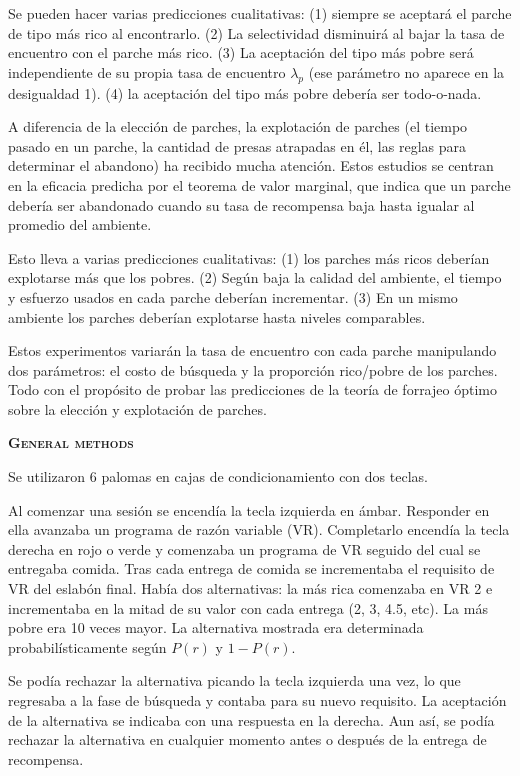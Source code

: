 \documentclass[a4paper,12pt]{article}
\begin{document}
Se pueden hacer varias predicciones cualitativas: (1) siempre se aceptará el parche de tipo más rico al encontrarlo. (2) La selectividad disminuirá al bajar la tasa de encuentro con el parche más rico. (3) La aceptación del tipo más pobre será independiente de su propia tasa de encuentro $\lambda_{p}$ (ese parámetro no aparece en la desigualdad 1). (4) la aceptación del tipo más pobre debería ser todo-o-nada.

A diferencia de la elección de parches, la explotación de parches (el tiempo pasado en un parche, la cantidad de presas atrapadas en él, las reglas para determinar el abandono) ha recibido mucha atención. Estos estudios se centran en la eficacia predicha por el teorema de valor marginal, que indica que un parche debería ser abandonado cuando su tasa de recompensa baja hasta igualar al promedio del ambiente.

Esto lleva a varias predicciones cualitativas: (1) los parches más ricos deberían explotarse más que los pobres. (2) Según baja la calidad del ambiente, el tiempo y esfuerzo usados en cada parche deberían incrementar. (3) En un mismo ambiente los parches deberían explotarse hasta niveles comparables.

Estos experimentos variarán la tasa de encuentro con cada parche manipulando dos parámetros: el costo de búsqueda y la proporción rico/pobre de los parches. Todo con el propósito de probar las predicciones de la teoría de forrajeo óptimo sobre la elección y explotación de parches.

{\scshape\bfseries General methods}

Se utilizaron 6 palomas en cajas de condicionamiento con dos teclas.

Al comenzar una sesión se encendía la tecla izquierda en ámbar. Responder en ella avanzaba un programa de razón variable (VR). Completarlo encendía la tecla derecha en rojo o verde y comenzaba un programa de VR seguido del cual se entregaba comida. Tras cada entrega de comida se incrementaba el requisito de VR del eslabón final. Había dos alternativas: la más rica comenzaba en VR 2 e incrementaba en la mitad de su valor con cada entrega (2, 3, 4.5, etc). La más pobre era 10 veces mayor. La alternativa mostrada era determinada probabilísticamente según $P(r)$ y $1-P(r)$.

Se podía rechazar la alternativa picando la tecla izquierda una vez, lo que regresaba a la fase de búsqueda y contaba para su nuevo requisito. La aceptación de la alternativa se indicaba con una respuesta en la derecha. Aun así, se podía rechazar la alternativa en cualquier momento antes o después de la entrega de recompensa.
\end{document}
